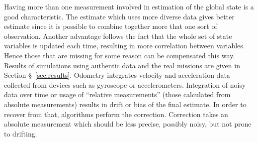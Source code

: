 Having more than one measurement involved in estimation of the global state is a good characteristic. The estimate which uses more diverse data gives better estimate since it is possible to combine together more that one sort of observation. Another advantage follows the fact that the whole set of state variables is updated each time, resulting in more correlation between variables. Hence those that are missing for some reason can be compensated this way. Results of simulations using authentic data and the  real missions are given in Section \S~\ref{sec:results}. Odometry integrates velocity and acceleration data collected from devices such as gyroscope or accelerometers. Integration of noisy data over time or usage of ``relative measurements'' (those calculated from absolute measurements) results in drift or bias of the final estimate. In order to recover from that, algorithms perform the correction. Correction takes an absolute measurement which should be less precise, possibly noisy, but not prone to drifting. %